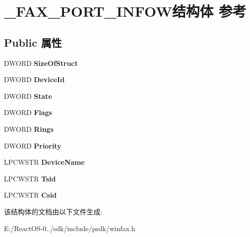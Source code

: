 \hypertarget{struct___f_a_x___p_o_r_t___i_n_f_o_w}{}\section{\+\_\+\+F\+A\+X\+\_\+\+P\+O\+R\+T\+\_\+\+I\+N\+F\+O\+W结构体 参考}
\label{struct___f_a_x___p_o_r_t___i_n_f_o_w}
\subsection*{Public 属性}
\begin{DoxyCompactItemize}
\item 
\mbox{\label{struct___f_a_x___p_o_r_t___i_n_f_o_w_a2d14d7fcdfd5243ff38d7084422dff5f}} 
D\+W\+O\+RD {\bfseries Size\+Of\+Struct}
\item 
\mbox{\label{struct___f_a_x___p_o_r_t___i_n_f_o_w_a9b5f3cc5dc57d2ff1aab464c2c395a22}} 
D\+W\+O\+RD {\bfseries Device\+Id}
\item 
\mbox{\label{struct___f_a_x___p_o_r_t___i_n_f_o_w_a85771f5d535c7e3a66b93e95bf5dc031}} 
D\+W\+O\+RD {\bfseries State}
\item 
\mbox{\label{struct___f_a_x___p_o_r_t___i_n_f_o_w_a35485e836329b468769caa2d4ef30203}} 
D\+W\+O\+RD {\bfseries Flags}
\item 
\mbox{\label{struct___f_a_x___p_o_r_t___i_n_f_o_w_ac707ef2e2cc29f3389aac78e250e0203}} 
D\+W\+O\+RD {\bfseries Rings}
\item 
\mbox{\label{struct___f_a_x___p_o_r_t___i_n_f_o_w_a6f4133e7824480d16519c956cd90e6e1}} 
D\+W\+O\+RD {\bfseries Priority}
\item 
\mbox{\label{struct___f_a_x___p_o_r_t___i_n_f_o_w_a5d28547ad707ab08cd20cfaa49434e29}} 
L\+P\+C\+W\+S\+TR {\bfseries Device\+Name}
\item 
\mbox{\label{struct___f_a_x___p_o_r_t___i_n_f_o_w_ab15ca8e8e3e41405ca35eb70b9ee126c}} 
L\+P\+C\+W\+S\+TR {\bfseries Tsid}
\item 
\mbox{\label{struct___f_a_x___p_o_r_t___i_n_f_o_w_a0920442b6be7de0a5bd7db859e835540}} 
L\+P\+C\+W\+S\+TR {\bfseries Csid}
\end{DoxyCompactItemize}


该结构体的文档由以下文件生成\+:\begin{DoxyCompactItemize}
\item 
E\+:/\+React\+O\+S-\/0../sdk/include/psdk/winfax.\+h\end{DoxyCompactItemize}
